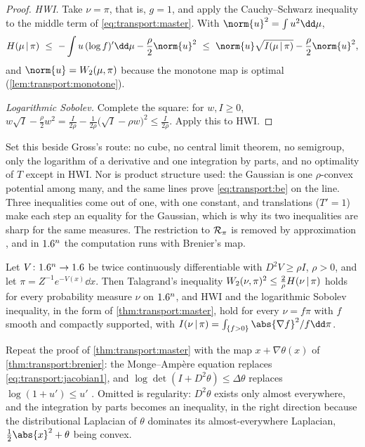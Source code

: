 \begin{refsection}
\begin{proof}
\emph{HWI.} Take $\nu=\pi$, that is, $g=1$, and apply the Cauchy--Schwarz inequality to the middle term of \eqref{eq:transport:master}. With $\norm{u}^2=\int u^2\dd\mu$,
\[
\transportH{\mu}{\pi}\ \le\ -\int u\,(\log f)'\dd\mu-\frac{\rho}{2}\norm{u}^2\ \le\ \norm{u}\sqrt{\transportI{\mu}{\pi}}-\frac{\rho}{2}\norm{u}^2,
\]
and $\norm{u}=\transportW(\mu,\pi)$ because the monotone map is optimal (\cref{lem:transport:monotone}).

\emph{Logarithmic Sobolev.} Complete the square: for $w,I\ge0$, $w\sqrt I-\frac{\rho}{2}w^2=\frac{I}{2\rho}-\frac{1}{2\rho}\bigl(\sqrt I-\rho w\bigr)^2\le\frac{I}{2\rho}$. Apply this to HWI.
\end{proof}

Set this beside Gross's route: no cube, no central limit theorem, no semigroup, only the logarithm of a derivative and one integration by parts, and no optimality of $T$ except in HWI. Nor is product structure used: the Gaussian is one $\rho$-convex potential among many, and the same lines prove \eqref{eq:transport:be} on the line. Three inequalities come out of one, with one constant, and translations ($T'=1$) make each step an equality for the Gaussian, which is why its two inequalities are sharp for the same measures. The restriction to $\mathcal{R}_\pi$ is removed by approximation \parencite{Villani2003}, and in $1.6^n$ the computation runs with Brenier's map.

\begin{theorem}\label{thm:transport:ndim}
Let $V\colon1.6^n\to1.6$ be twice continuously differentiable with $D^2V\ge\rho I$, $\rho>0$, and let $\pi=Z^{-1}e^{-V(x)}\dd x$. Then Talagrand's inequality $W_2(\nu,\pi)^2\le\frac{2}{\rho}H(\nu\,|\,\pi)$ holds for every probability measure $\nu$ on $1.6^n$, and HWI and the logarithmic Sobolev inequality, in the form of \cref{thm:transport:master}, hold for every $\nu=f\pi$ with $f$ smooth and compactly supported, with $\transportI{\nu}{\pi}=\int_{\{f>0\}}\abs{\nabla f}^2/f\dd\pi$.
\end{theorem}

\begin{proofsketch}
Repeat the proof of \cref{thm:transport:master} with the map $x+\nabla\theta(x)$ of \cref{thm:transport:brenier}: the Monge--Amp\`ere equation replaces \eqref{eq:transport:jacobian1}, and $\log\det(I+D^2\theta)\le\Delta\theta$ replaces $\log(1+u')\le u'$ \parencite{CorderoErausquin2002}. Omitted is regularity: $D^2\theta$ exists only almost everywhere, and the integration by parts becomes an inequality, in the right direction because the distributional Laplacian of $\theta$ dominates its almost-everywhere Laplacian, $\frac12\abs{x}^2+\theta$ being convex.
\end{proofsketch}


\end{refsection}
